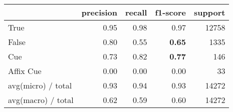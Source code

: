 \begin{tabular}{lrrrr}
    \toprule
    {} &      precision &  recall &  f1-score & support \\
    \midrule
    True &         0.95 &    0.98 &      0.97 &   12758 \\
    False &        0.80 &    0.55 &      \textbf{0.65} &    1335 \\
    Cue &          0.73 &    0.82 &      \textbf{0.77} &     146 \\
    Affix Cue &    0.00 &    0.00 &      0.00 &      33 \\
    \bottomrule
    avg(micro) / total &  0.93 &    0.94 &      0.93 & 14272 \\
    avg(macro) / total &  0.62 &    0.59 &      0.60 & 14272 \\  
    \end{tabular}
    